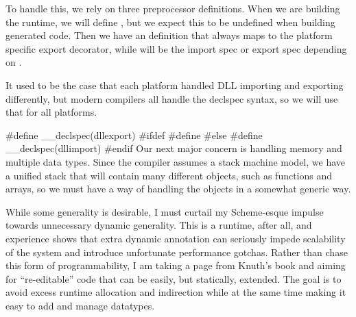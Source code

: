 \documentclass{article}%
\begin{document}
To handle this, we rely on three preprocessor definitions.
When we are building the runtime,
we will define {\Tt{}\nwendquote},
but we expect this to be undefined when building generated code.
Then we have an {\Tt{}\nwendquote} definition
that always maps to the platform specific export decorator,
while {\Tt{}\nwendquote} will be the import spec or export spec
depending on {\Tt{}\nwendquote}.

It used to be the case
that each platform handled DLL importing and exporting differently,
but modern compilers all handle the {\Tt{}{\_}{\_}declspec\nwendquote} syntax,
so we will use that for all platforms.

\nwenddocs{}\endmoddef\nwstartdeflinemarkup{}\nwenddeflinemarkup
#define  __declspec(dllexport)
#ifdef 
        #define  
#else
        #define  __declspec(dllimport)
#endif
\eatline
{}\nwendcode{}\nwdocspar
Our next major concern is handling memory and multiple data types.
Since the compiler assumes a stack machine model,
we have a unified stack that will contain many different objects,
such as functions and arrays,
so we must have a way of handling the objects
in a somewhat generic way.

While some generality is desirable,
I must curtail my Scheme-esque impulse
towards unnecessary dynamic generality.
This is a runtime, after all,
and experience shows that extra
dynamic annotation can seriously impede scalability
of the system and introduce unfortunate performance gotchas.
Rather than chase this form of programmability,
I am taking a page from Knuth's book
and aiming for ``re-editable'' code 
that can be easily, but statically, extended.
The goal is to avoid excess runtime allocation and indirection
while at the same time making it easy to add and manage datatypes.
\end{document}
